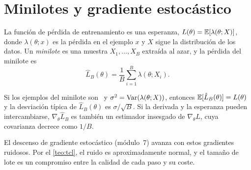 \section{Minilotes y gradiente estocástico}

La función de pérdida de entrenamiento es una esperanza, $L(\theta)=\mathbb{E}[\lambda(\theta;X)]$, donde $\lambda(\theta;x)$ es la pérdida en el ejemplo $x$ y $X$ sigue la distribución de los datos. Un \emph{minilote} es una muestra $X_1,\dots,X_B$ extraída al azar, y la pérdida del minilote es
\[
\hat L_B(\theta)=\frac1B\sum_{i=1}^{B}\lambda(\theta;X_i).
\]

\begin{proposicion}\label{prop:minilote}
Si los ejemplos del minilote son \iid\ y $\sigma^{2}=\operatorname{Var}(\lambda(\theta;X))$, entonces $\mathbb{E}[\hat L_B(\theta)]=L(\theta)$ y la desviación típica de $\hat L_B(\theta)$ es $\sigma/\sqrt B$. Si la derivada y la esperanza pueden intercambiarse, $\nabla_\theta\hat L_B$ es también un estimador insesgado de $\nabla_\theta L$, cuya covarianza decrece como $1/B$.
\end{proposicion}

\addtocounter{definicion}{1}%

El descenso de gradiente estocástico (módulo~7) avanza con estos gradientes ruidosos. Por el \cref{teo:tcl}, el ruido es aproximadamente normal, y el tamaño de lote es un compromiso entre la calidad de cada paso y su coste.

